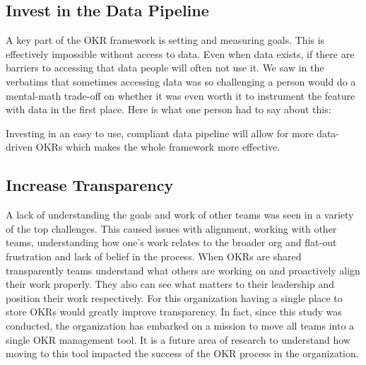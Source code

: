 \documentclass[sigconf, nonacm]{acmart}
\begin{document}
\subsection{Invest in the Data Pipeline}
A key part of the OKR framework is setting and measuring goals. This is effectively impossible without access to data. Even when data exists, if there are barriers to accessing that data people will often not use it. We saw in the verbatims that sometimes accessing data was so challenging a person would do a mental-math trade-off on whether it was even worth it to instrument the feature with data in the first place. Here is what one person had to say about this:


Investing in an easy to use, compliant data pipeline will allow for more data-driven OKRs which makes the whole framework more effective.

\subsection{Increase Transparency}
A lack of understanding the goals and work of other teams was seen in a variety of the top challenges. This caused issues with alignment, working with other teams, understanding how one's work relates to the broader org and flat-out frustration and lack of belief in the process. When OKRs are shared transparently teams understand what others are working on and proactively align their work properly. They also can see what matters to their leadership and position their work respectively. For this organization having a single place to store OKRs would greatly improve transparency. In fact, since this study was conducted, the organization has embarked on a mission to move all teams into a single OKR management tool. It is a future area of research to understand how moving to this tool impacted the success of the OKR process in the organization.
\end{document}
